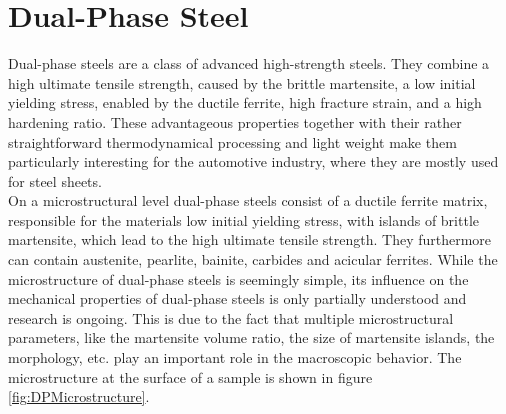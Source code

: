 \chapter{Dual-Phase Steel}

Dual-phase steels are a class of advanced high-strength steels. They combine a high ultimate tensile strength, caused by the brittle martensite, a low initial yielding stress, enabled by the ductile ferrite, high fracture strain, and a high hardening ratio. These advantageous properties together with their rather straightforward thermodynamical processing and light weight make them particularly interesting for the automotive industry, where they are mostly used for steel sheets. \\


On a microstructural level dual-phase steels consist of a ductile ferrite matrix, responsible for the materials low initial yielding stress, with islands of brittle martensite, which lead to the high ultimate tensile strength. They furthermore can contain austenite, pearlite, bainite, carbides and acicular ferrites. While the microstructure of dual-phase steels is seemingly simple, its influence on the mechanical properties of dual-phase steels is only partially understood and research is ongoing. This is due to the fact that multiple microstructural parameters, like the martensite volume ratio, the size of martensite islands, the morphology, etc. play an important role in the macroscopic behavior. The microstructure at the surface of a sample is shown in figure \ref{fig:DPMicrostructure}. \\

